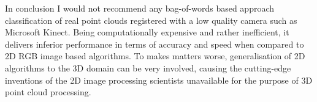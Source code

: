 	In conclusion I would not recommend any bag-of-words based approach classification of real point clouds registered with a low quality camera such as Microsoft Kinect. Being computationally expensive and rather inefficient, it delivers inferior performance in terms of accuracy and speed when compared to 2D RGB image based algorithms. To makes matters worse, generalisation of 2D algorithms to the 3D domain can be very involved, causing the cutting-edge inventions of the 2D image processing scientists unavailable for the purpose of 3D point cloud processing.